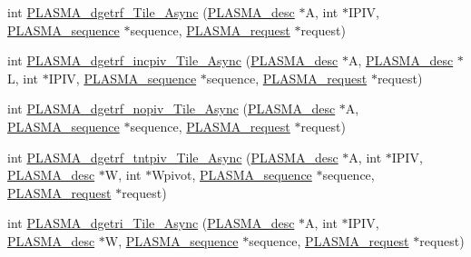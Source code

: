 \begin{DoxyCompactItemize}
\item 
int \hyperlink{group__double__Tile__Async_ga891055c2a164601c38023d588f232ab6_ga891055c2a164601c38023d588f232ab6}{P\+L\+A\+S\+M\+A\+\_\+dgetrf\+\_\+\+Tile\+\_\+\+Async} (\hyperlink{structplasma__desc__t}{P\+L\+A\+S\+M\+A\+\_\+desc} $\ast$A, int $\ast$I\+P\+I\+V, \hyperlink{structplasma__sequence__t}{P\+L\+A\+S\+M\+A\+\_\+sequence} $\ast$sequence, \hyperlink{structplasma__request__t}{P\+L\+A\+S\+M\+A\+\_\+request} $\ast$request)
\item 
int \hyperlink{group__double__Tile__Async_ga3bdb76d79b90c3e0db58d6d70939fcd0_ga3bdb76d79b90c3e0db58d6d70939fcd0}{P\+L\+A\+S\+M\+A\+\_\+dgetrf\+\_\+incpiv\+\_\+\+Tile\+\_\+\+Async} (\hyperlink{structplasma__desc__t}{P\+L\+A\+S\+M\+A\+\_\+desc} $\ast$A, \hyperlink{structplasma__desc__t}{P\+L\+A\+S\+M\+A\+\_\+desc} $\ast$L, int $\ast$I\+P\+I\+V, \hyperlink{structplasma__sequence__t}{P\+L\+A\+S\+M\+A\+\_\+sequence} $\ast$sequence, \hyperlink{structplasma__request__t}{P\+L\+A\+S\+M\+A\+\_\+request} $\ast$request)
\item 
int \hyperlink{group__double__Tile__Async_gaede95035e7a51a13141086fc82aa4f4b_gaede95035e7a51a13141086fc82aa4f4b}{P\+L\+A\+S\+M\+A\+\_\+dgetrf\+\_\+nopiv\+\_\+\+Tile\+\_\+\+Async} (\hyperlink{structplasma__desc__t}{P\+L\+A\+S\+M\+A\+\_\+desc} $\ast$A, \hyperlink{structplasma__sequence__t}{P\+L\+A\+S\+M\+A\+\_\+sequence} $\ast$sequence, \hyperlink{structplasma__request__t}{P\+L\+A\+S\+M\+A\+\_\+request} $\ast$request)
\item 
int \hyperlink{group__double__Tile__Async_gaf6ad117c3cde563dbcd84698dddd0397_gaf6ad117c3cde563dbcd84698dddd0397}{P\+L\+A\+S\+M\+A\+\_\+dgetrf\+\_\+tntpiv\+\_\+\+Tile\+\_\+\+Async} (\hyperlink{structplasma__desc__t}{P\+L\+A\+S\+M\+A\+\_\+desc} $\ast$A, int $\ast$I\+P\+I\+V, \hyperlink{structplasma__desc__t}{P\+L\+A\+S\+M\+A\+\_\+desc} $\ast$W, int $\ast$Wpivot, \hyperlink{structplasma__sequence__t}{P\+L\+A\+S\+M\+A\+\_\+sequence} $\ast$sequence, \hyperlink{structplasma__request__t}{P\+L\+A\+S\+M\+A\+\_\+request} $\ast$request)
\item 
int \hyperlink{group__double__Tile__Async_gac9d1310b4a653be484339d74df492c97_gac9d1310b4a653be484339d74df492c97}{P\+L\+A\+S\+M\+A\+\_\+dgetri\+\_\+\+Tile\+\_\+\+Async} (\hyperlink{structplasma__desc__t}{P\+L\+A\+S\+M\+A\+\_\+desc} $\ast$A, int $\ast$I\+P\+I\+V, \hyperlink{structplasma__desc__t}{P\+L\+A\+S\+M\+A\+\_\+desc} $\ast$W, \hyperlink{structplasma__sequence__t}{P\+L\+A\+S\+M\+A\+\_\+sequence} $\ast$sequence, \hyperlink{structplasma__request__t}{P\+L\+A\+S\+M\+A\+\_\+request} $\ast$request)

\end{DoxyCompactItemize}
